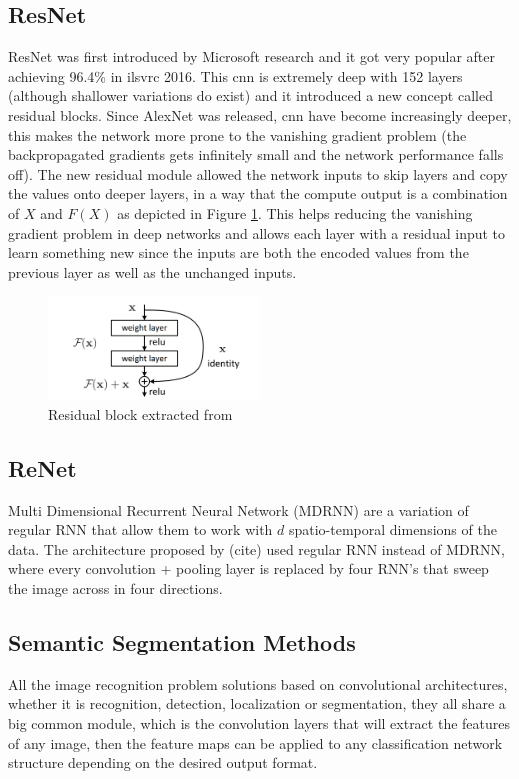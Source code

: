 \subsection{ResNet}
ResNet \cite{DBLP:journals/corr/HeZRS15} was first introduced by Microsoft research and it got very popular after achieving 96.4\% in \gls{ilsvrc} 2016. This \gls{cnn} is extremely deep with 152 layers (although shallower variations do exist) and it introduced a new concept called residual blocks. Since AlexNet was released, \gls{cnn} have become increasingly deeper, this makes the network more prone to the vanishing gradient problem (the backpropagated gradients gets infinitely small and the network performance falls off). The new residual module allowed the network inputs to skip layers and copy the values onto deeper layers, in a way that the compute output is a combination of $X$ and $F(X)$ as depicted in Figure \ref{fig:residual}. This helps reducing the vanishing gradient problem in deep networks and allows each layer with a residual input to learn something new since the inputs are both the encoded values from the previous layer as well as the unchanged inputs.

\begin{figure}
	\includegraphics[width=0.5\textwidth]{archivos/residual.png}
	\centering
	\caption{Residual block extracted from \cite{DBLP:journals/corr/HeZRS15}}
	\label{fig:residual}
\end{figure}

\subsection{ReNet}
Multi Dimensional Recurrent Neural Network (MDRNN) are a variation of regular RNN that allow them to work with $d$ spatio-temporal dimensions of the data. The architecture proposed by (cite) used regular RNN instead of MDRNN, where every convolution + pooling layer is replaced by four RNN's that sweep the image across in four directions. 

\subsection{Semantic Segmentation Methods}
All the image recognition problem solutions based on convolutional architectures, whether it is recognition, detection, localization or segmentation, they all share a big common module, which is the convolution layers that will extract the features of any image, then the feature maps can be applied to any classification network structure depending on the desired output format.

